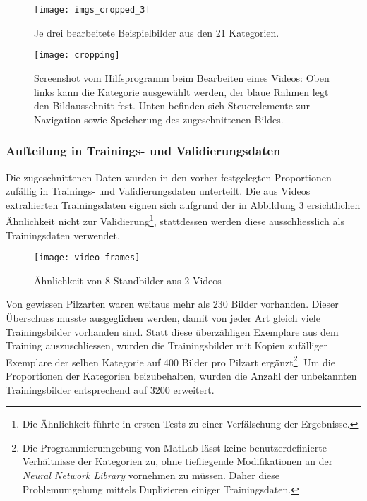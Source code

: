 \begin{figure}[h]
	\centering
	\texttt{[image: imgs\_cropped\_3]}
	\caption[\textit{Beispiele Trainingsbilder}]{Je drei bearbeitete Beispielbilder aus den 21 Kategorien.}
	\label{img:cropped_imgs}
\end{figure}

\begin{figure}[h]
	\centering
	\texttt{[image: cropping]}
	\caption[Hilfsprogramm]{Screenshot vom Hilfsprogramm beim Bearbeiten eines Videos: Oben links kann die Kategorie ausgewählt werden, der blaue Rahmen legt den Bildausschnitt fest. Unten befinden sich Steuerelemente zur Navigation sowie Speicherung des zugeschnittenen Bildes.}
	\label{img:precrocessing}
\end{figure}


\subsubsection{Aufteilung in Trainings- und Validierungsdaten}
Die zugeschnittenen Daten wurden in den vorher festgelegten Proportionen zufällig in Trainings- und Validierungsdaten unterteilt. Die aus Videos extrahierten Trainingsdaten eignen sich aufgrund der in Abbildung \ref{img:video_frames} ersichtlichen Ähnlichkeit nicht zur Validierung\footnote{Die Ähnlichkeit führte in ersten Tests zu einer Verfälschung der Ergebnisse.}, stattdessen werden diese ausschliesslich als Trainingsdaten verwendet.

\begin{figure}[h]
	\centering
	\texttt{[image: video\_frames]}
	\caption[Video-Frames]{Ähnlichkeit von 8 Standbilder aus 2 Videos}
	\label{img:video_frames}
\end{figure}

Von gewissen Pilzarten waren weitaus mehr als 230 Bilder vorhanden. Dieser Überschuss musste ausgeglichen werden, damit von jeder Art gleich viele Trainingsbilder vorhanden sind. Statt diese überzähligen Exemplare aus dem Training auszuschliessen, wurden die Trainingsbilder mit Kopien zufälliger Exemplare der selben Kategorie auf 400 Bilder pro Pilzart ergänzt\footnote{Die Programmierumgebung von MatLab lässt keine benutzerdefinierte Verhältnisse der Kategorien zu, ohne tiefliegende Modifikationen an der \textit{Neural Network Library} vornehmen zu müssen. Daher diese Problemumgehung mittels Duplizieren einiger Trainingsdaten.}. Um die Proportionen der Kategorien beizubehalten, wurden die Anzahl der unbekannten Trainingsbilder entsprechend auf 3200 erweitert.

